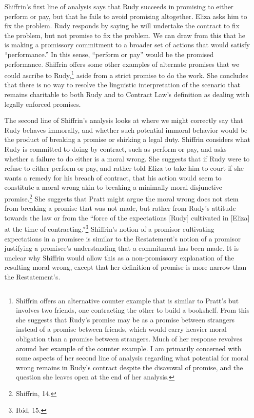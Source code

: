 Shiffrin's first line of analysis says that Rudy succeeds in promising
to either perform or pay, but that he fails to avoid promising
altogether. Eliza asks him to fix the problem. Rudy responds by saying
he will undertake the contract to fix the problem, but not promise to
fix the problem. We can draw from this that he is making a promissory
commitment to a broader set of actions that would satisfy
``performance.'' In this sense, ``perform or pay'' would be the promised
performance. Shiffrin offers some other examples of alternate promises
that we could ascribe to Rudy,\footnote{Shiffrin offers an alternative
  counter example that is similar to Pratt's but involves two friends,
  one contracting the other to build a bookshelf. From this she suggests
  that Rudy's promise may be as a promise between strangers instead of a
  promise between friends, which would carry heavier moral obligation
  than a promise between strangers. Much of her response revolves around
  her example of the counter example. I am primarily concerned with some
  aspects of her second line of analysis regarding what potential for
  moral wrong remains in Rudy's contract despite the disavowal of
  promise, and the question she leaves open at the end of her analysis.}
aside from a strict promise to do the work. She concludes that there is
no way to resolve the linguistic interpretation of the scenario that
remains charitable to both Rudy and to Contract Law's definition as
dealing with legally enforced promises.

The second line of Shiffrin's analysis looks at where we might correctly
say that Rudy behaves immorally, and whether such potential immoral
behavior would be the product of breaking a promise or shirking a legal
duty. Shiffrin considers what Rudy is committed to doing by contract,
such as perform or pay, and asks whether a failure to do either is a
moral wrong. She suggests that if Rudy were to refuse to either perform
or pay, and rather told Eliza to take him to court if she wants a remedy
for his breach of contract, that his action would seem to constitute a
moral wrong akin to breaking a minimally moral disjunctive
promise.\footnote{Shiffrin, 14.} She suggests that Pratt might argue the
moral wrong does not stem from breaking a promise that was not made, but
rather from Rudy's attitude towards the law or from the ``force of the
expectations {[}Rudy{]} cultivated in {[}Eliza{]} at the time of
contracting.''\footnote{Ibid, 15.} Shiffrin's notion of a promisor
cultivating expectations in a promisee is similar to the Restatement's
notion of a promisor justifying a promisee's understanding that a
commitment has been made. It is unclear why Shiffrin would allow this as
a non-promissory explanation of the resulting moral wrong, except that
her definition of promise is more narrow than the Restatement's.

